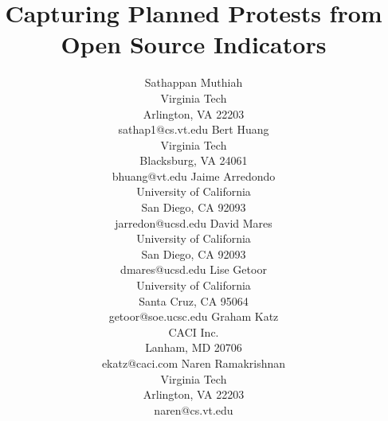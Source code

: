 \documentclass[letterpaper]{article}
\begin{document}
\newcommand{\narenc}[1]{[{\color{red} Naren writes: \it #1}]}
\newcommand{\sathappanc}[1]{[{\color{blue} Sathappan writes: \it #1}]}
\newcommand{\then}{\Rightarrow}
\newcommand{\softor}{\operatornamewithlimits{{\vee}}}
\newcommand{\softand}{\operatornamewithlimits{{\wedge}}}
\newcommand{\softthen}{\operatornamewithlimits{{\then}}}
\newcommand{\softneg}{\operatornamewithlimits{{\neg}}}
\theoremstyle{plain}
\newtheorem{exmp}{Example}
\title{Capturing Planned Protests from Open Source Indicators}
\author{
Sathappan Muthiah\\
Virginia Tech\\
Arlington, VA 22203\\
sathap1@cs.vt.edu
\And
Bert Huang\\
       Virginia Tech\\
       Blacksburg, VA 24061\\
       bhuang@vt.edu
       \And
Jaime Arredondo\\
       University of California\\
       San Diego, CA 92093\\
       jarredon@ucsd.edu
\AND 
David Mares\\
       University of California\\
       San Diego, CA 92093\\
       dmares@ucsd.edu
       \And
Lise Getoor\\
       University of California\\
       Santa Cruz, CA 95064\\
       getoor@soe.ucsc.edu
       \And
Graham Katz\\
       CACI Inc.\\
       Lanham, MD 20706\\
       ekatz@caci.com
       \And
Naren Ramakrishnan\\
       Virginia Tech\\
       Arlington, VA 22203\\
       naren@cs.vt.edu
}
\maketitle
\begin{abstract}
\begin{quote}

\end{quote}
\end{abstract}
\label{intro}

\end{document}
